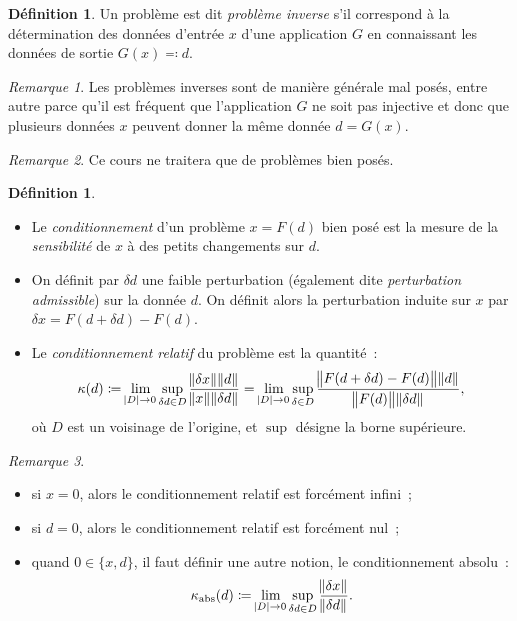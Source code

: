 \documentclass{article}
\theoremstyle{definition}
\newtheorem{déf}[thm]{Définition}
\theoremstyle{remark}
\newtheorem*{rmq}{Remarque}
\newcommand{\kappaabs}{\kappa_{\text{abs}}}
\begin{document}
	\begin{déf} Un problème est dit \emph{problème inverse} s'il correspond à la détermination des données d'entrée $x$ d'une application $G$ en connaissant
	les données de sortie $G(x) \eqqcolon d$.
	\end{déf}

	\begin{rmq} Les problèmes inverses sont de manière générale mal posés, entre autre parce qu'il est fréquent que l'application $G$ ne soit pas injective
	et donc que plusieurs données $x$ peuvent donner la même donnée $d = G(x)$.
	\end{rmq}

	\begin{rmq} Ce cours ne traitera que de problèmes bien posés. \end{rmq}

	\begin{déf}~
	\begin{itemize}
		\item Le \emph{conditionnement} d'un problème $x = F(d)$ bien posé est la mesure de la \emph{sensibilité} de $x$ à des petits changements sur $d$.
		\item On définit par $\delta d$ une faible perturbation (également dite \emph{perturbation admissible}) sur la donnée $d$. On définit alors la
		      perturbation induite sur $x$ par $\delta x = F(d + \delta d) - F(d)$.
		\item Le \emph{conditionnement relatif} du problème est la quantité~:
		      \[\kappa(d) \coloneqq \lim_{\abs D \to 0}\sup_{\delta d \in D} \frac {\norm {\delta x}\norm d}{\norm x\norm{\delta d}}
			  = \lim_{\abs D \to 0}\sup_{\delta \in D}\frac {\norm {F(d + \delta d) - F(d)}\norm d}{\norm {F(d)}\norm {\delta d}},\]
		      où $D$ est un voisinage de l'origine, et $\sup$ désigne la borne supérieure.
	\end{itemize}
	\end{déf}

	\begin{rmq}~
	\begin{itemize}
		\item si $x = 0$, alors le conditionnement relatif est forcément infini~;
		\item si $d = 0$, alors le conditionnement relatif est forcément nul~;
		\item quand $0 \in \{x, d\}$, il faut définir une autre notion, le conditionnement absolu~:
		      \[\kappaabs(d) \coloneqq \lim_{\abs D \to 0}\sup_{\delta d \in D}\frac {\norm {\delta x}}{\norm {\delta d}}.\]
	\end{itemize}
	\end{rmq}
\end{document}
